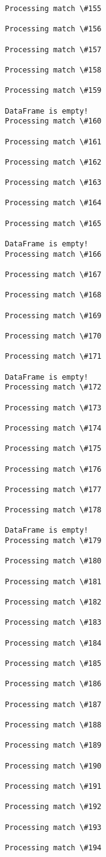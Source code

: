 \documentclass[11pt]{article}
\begin{document}
\begin{Verbatim}[commandchars=\\\{\}]
Processing match \#155

Processing match \#156

Processing match \#157

Processing match \#158

Processing match \#159

DataFrame is empty!
Processing match \#160

Processing match \#161

Processing match \#162

Processing match \#163

Processing match \#164

Processing match \#165

DataFrame is empty!
Processing match \#166

Processing match \#167

Processing match \#168

Processing match \#169

Processing match \#170

Processing match \#171

DataFrame is empty!
Processing match \#172

Processing match \#173

Processing match \#174

Processing match \#175

Processing match \#176

Processing match \#177

Processing match \#178

DataFrame is empty!
Processing match \#179

Processing match \#180

Processing match \#181

Processing match \#182

Processing match \#183

Processing match \#184

Processing match \#185

Processing match \#186

Processing match \#187

Processing match \#188

Processing match \#189

Processing match \#190

Processing match \#191

Processing match \#192

Processing match \#193

Processing match \#194


\end{Verbatim}
\end{document}
